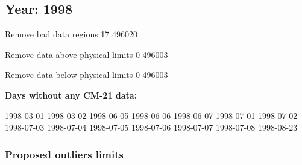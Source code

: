 \documentclass[
  10pt,
  a4paper,oneside]{article}
\begin{document}
\FloatBarrier

\newpage

\hypertarget{year-1998}{%
\subsection{Year: 1998}\label{year-1998}}

Remove bad data regions
17 496020

Remove data above physical limits
0 496003

Remove data below physical limits
0 496003

\textbf{Days without any CM-21 data:}

1998-03-01 1998-03-02 1998-06-05 1998-06-06 1998-06-07 1998-07-01 1998-07-02 1998-07-03 1998-07-04 1998-07-05 1998-07-06 1998-07-07 1998-07-08 1998-08-23

\hypertarget{proposed-outliers-limits-5}{%
\subsubsection{Proposed outliers limits}\label{proposed-outliers-limits-5}}

\footnotesize
\end{document}
